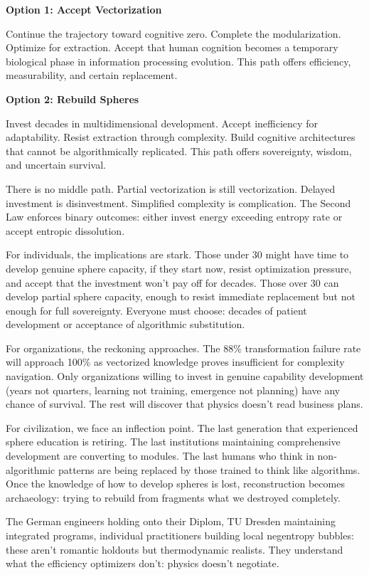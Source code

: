 \textbf{Option 1: Accept Vectorization}

Continue the trajectory toward cognitive zero. Complete the modularization. Optimize for extraction. Accept that human cognition becomes a temporary biological phase in information processing evolution. This path offers efficiency, measurability, and certain replacement.

\textbf{Option 2: Rebuild Spheres}

Invest decades in multidimensional development. Accept inefficiency for adaptability. Resist extraction through complexity. Build cognitive architectures that cannot be algorithmically replicated. This path offers sovereignty, wisdom, and uncertain survival.

There is no middle path. Partial vectorization is still vectorization. Delayed investment is disinvestment. Simplified complexity is complication. The Second Law enforces binary outcomes: either invest energy exceeding entropy rate or accept entropic dissolution.

For individuals, the implications are stark. Those under 30 might have time to develop genuine sphere capacity, if they start now, resist optimization pressure, and accept that the investment won't pay off for decades. Those over 30 can develop partial sphere capacity, enough to resist immediate replacement but not enough for full sovereignty. Everyone must choose: decades of patient development or acceptance of algorithmic substitution.

For organizations, the reckoning approaches. The 88\% transformation failure rate will approach 100\% as vectorized knowledge proves insufficient for complexity navigation. Only organizations willing to invest in genuine capability development (years not quarters, learning not training, emergence not planning) have any chance of survival. The rest will discover that physics doesn't read business plans.

For civilization, we face an inflection point. The last generation that experienced sphere education is retiring. The last institutions maintaining comprehensive development are converting to modules. The last humans who think in non-algorithmic patterns are being replaced by those trained to think like algorithms. Once the knowledge of how to develop spheres is lost, reconstruction becomes archaeology: trying to rebuild from fragments what we destroyed completely.

The German engineers holding onto their Diplom, TU Dresden maintaining integrated programs, individual practitioners building local negentropy bubbles: these aren't romantic holdouts but thermodynamic realists. They understand what the efficiency optimizers don't: physics doesn't negotiate.

